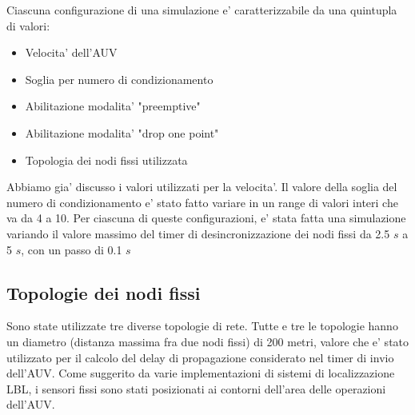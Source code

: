 \par
Ciascuna configurazione di una simulazione e' caratterizzabile da una quintupla di valori:
\begin{itemize}
    \item Velocita' dell'AUV
    \item Soglia per numero di condizionamento
    \item Abilitazione modalita' "preemptive"
    \item Abilitazione modalita' "drop one point"
    \item Topologia dei nodi fissi utilizzata
\end{itemize}
Abbiamo gia' discusso i valori utilizzati per la velocita'. Il valore della soglia del numero di condizionamento e' stato fatto variare in un range di valori interi che va da 4 a 10. Per ciascuna di queste configurazioni, e' stata fatta una simulazione variando il valore massimo del timer di desincronizzazione dei nodi fissi da 2.5 $s$ a 5 $s$, con un passo di 0.1 $s$

\subsection{Topologie dei nodi fissi}
Sono state utilizzate tre diverse topologie di rete. Tutte e tre le topologie hanno un diametro (distanza massima fra due nodi fissi) di 200 metri, valore che e' stato utilizzato per il calcolo del delay di propagazione considerato nel timer di invio dell'AUV. Come suggerito da varie implementazioni di sistemi di localizzazione LBL, i sensori fissi sono stati posizionati ai contorni dell'area delle operazioni dell'AUV. \newline
